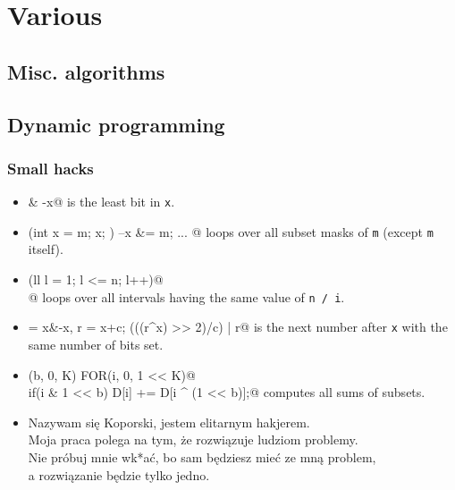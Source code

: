 \chapter{Various}

\section{Misc. algorithms}

\section{Dynamic programming}
	\subsection{Small hacks}
		\begin{itemize}
			\item \verb@x & -x@ is the least bit in \texttt{x}.
			\item \verb@for(int x = m; x; ) { --x &= m; ... }@ loops over all subset masks of \texttt{m} (except \texttt{m} itself).
			\item \verb@for(ll l = 1; l <= n; l++)@ \\ @ loops over all intervals having the same value of \texttt{n / i}.
			\item \verb@c = x&-x, r = x+c; (((r^x) >> 2)/c) | r@ is the next number after \texttt{x} with the same number of bits set.
			\item \verb@FOR(b, 0, K) FOR(i, 0, 1 << K)@ \\ \verb@  if(i & 1 << b) D[i] += D[i ^ (1 << b)];@ computes all sums of subsets.
			\item Nazywam się Koporski, jestem elitarnym hakjerem. \\
						Moja praca polega na tym, że rozwiązuje ludziom problemy. \\
						Nie próbuj mnie wk*ać, bo sam będziesz mieć ze mną problem, \\
						a rozwiązanie będzie tylko jedno.
		\end{itemize}


